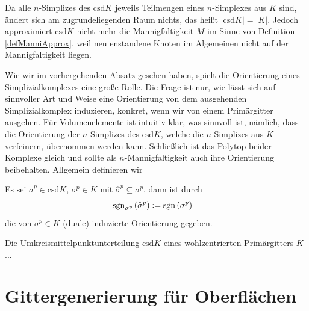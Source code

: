     \begin{bemerkung}
      Da alle \( n \)-Simplizes des \(\text{csd}K  \) jeweils Teilmengen eines \( n \)-Simplexes aus \( K \) sind, ändert sich am zugrundeliegenden Raum nichts, das heißt
      \( |\text{csd}K| = |K| \). 
      Jedoch approximiert \(\text{csd}K\) nicht mehr die Mannigfaltigkeit \( M \) im Sinne von Definition \ref{defManniApprox}, weil neu enstandene Knoten im Algemeinen nicht auf der Mannigfaltigkeit
      liegen. 
    \end{bemerkung}

    Wie wir im vorhergehenden Absatz gesehen haben, spielt die Orientierung eines Simplizialkomplexes eine große Rolle. Die Frage ist nur,
    wie lässt sich auf sinnvoller Art und Weise eine Orientierung von dem ausgehenden Simplizialkomplex induzieren, konkret, wenn wir von
    einem Primärgitter ausgehen.
    Für Volumenelemente ist intuitiv klar, was sinnvoll ist, nämlich, dass die Orientierung der \( n \)-Simplizes des  \( \text{csd}K \),
    welche die \( n \)-Simplizes aus  \( K \) verfeinern, übernommen werden kann. Schließlich ist das Polytop beider Komplexe gleich und
    sollte als \( n \)-Mannigfaltigkeit auch ihre Orientierung beibehalten.
    Allgemein definieren wir

    \begin{definition}
      Es sei \( \hat{\sigma}^{p} \in \text{csd}K \), \( \sigma^{p} \in K \) mit \( \hat{\sigma}^{p} \subseteq \sigma^{p}\), dann ist durch
      \begin{align}
        \mathop{\mathrm{sgn}}\nolimits_{\sigma^{p}}\left( \hat{\sigma}^{p} \right) &:= \mathop{\mathrm{sgn}}\nolimits\left( \sigma^{p} \right)
      \end{align}
      die von \( \sigma^{p}\in K \) (duale) induzierte Orientierung gegeben. 
    \end{definition}

    \begin{definition}
      Die Umkreismittelpunktunterteilung \( \text{csd}K \) eines wohlzentrierten Primärgitters \( K \)...
    \end{definition}



\section{Gittergenerierung für Oberflächen}


